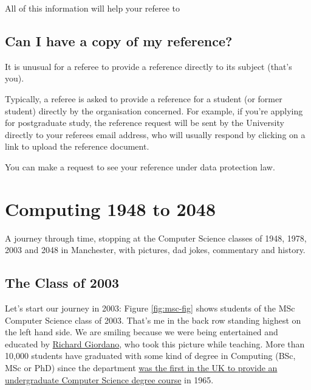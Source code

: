 \documentclass[
  12pt,
]{book}
\begin{document}
All of this information will help your referee to

\hypertarget{can-i-have-a-copy-of-my-reference}{%
\section{Can I have a copy of my reference?}\label{can-i-have-a-copy-of-my-reference}}

It is unusual for a referee to provide a reference directly to its subject (that's you).

Typically, a referee is asked to provide a reference for a student (or former student) directly by the organisation concerned. For example, if you're applying for postgraduate study, the reference request will be sent by the University directly to your referees email address, who will usually respond by clicking on a link to upload the reference document.

You can make a request to see your reference under data protection law.

\hypertarget{mastersofscience}{%
\chapter{Computing 1948 to 2048}\label{mastersofscience}}

A journey through time, stopping at the Computer Science classes of 1948, 1978, 2003 and 2048 in Manchester, with pictures, dad jokes, commentary and history. \citep{lavington}

\hypertarget{y2003}{%
\section{The Class of 2003}\label{y2003}}

Let's start our journey in 2003: Figure \ref{fig:msc-fig} shows students of the MSc Computer Science class of 2003. That's me in the back row standing highest on the left hand side. We are smiling because we were being entertained and educated by \href{https://www.southampton.ac.uk/healthsciences/about/staff/richard_giordano.page}{Richard Giordano}, who took this picture while teaching. More than 10,000 students have graduated with some kind of degree in Computing (BSc, MSc or PhD) since the department \href{http://www.bbc.co.uk/manchester/content/articles/2005/11/07/baby_computer_40_interview_feature.shtml}{was the first in the UK to provide an undergraduate Computer Science degree course} in 1965.
\end{document}
